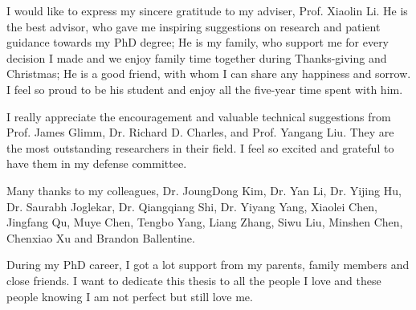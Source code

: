 I would like to express my sincere gratitude to my adviser, Prof. 
Xiaolin Li. He is the best advisor, who gave me inspiring suggestions
on research and patient guidance towards my PhD degree; He is my family, who 
support me for every decision I made and we enjoy family time together 
during Thanks-giving and Christmas; He is a good friend, with whom I can share
any happiness and sorrow. I feel so proud to be his student and enjoy all the
five-year time spent with him.

I really appreciate the encouragement and valuable technical suggestions from
Prof. James Glimm, Dr. Richard D. Charles, and Prof. Yangang Liu. 
They are the most outstanding researchers in their field. I feel so
excited and grateful to have them in my defense committee.  

Many thanks to my colleagues, Dr. JoungDong Kim, Dr. Yan Li, 
Dr. Yijing Hu, Dr.  Saurabh Joglekar, Dr. Qiangqiang Shi, 
Dr. Yiyang Yang, Xiaolei Chen, Jingfang Qu, Muye Chen, 
Tengbo Yang, Liang Zhang, Siwu Liu, Minshen Chen, Chenxiao Xu and Brandon Ballentine.

During my PhD career, I got a lot support from my parents, family 
members and close friends. I want to dedicate this thesis to all the people
I love and these people knowing I am not perfect but still love me.